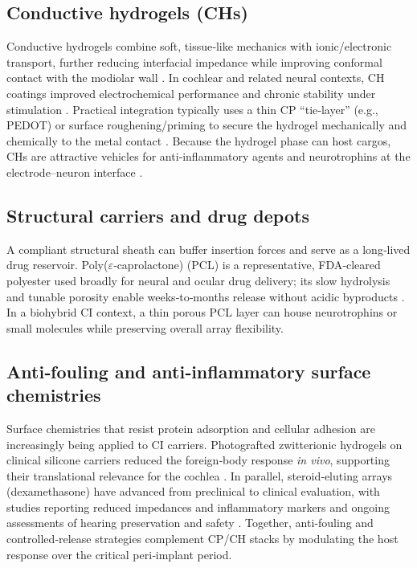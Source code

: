 \subsection{Conductive hydrogels (CHs)}
Conductive hydrogels combine soft, tissue‑like mechanics with ionic/electronic transport, further reducing interfacial impedance while improving conformal contact with the modiolar wall \cite{Green2012}. In cochlear and related neural contexts, CH coatings improved electrochemical performance and chronic stability under stimulation \cite{Hassarati2014,Dalrymple2020,Hyakumura2021}. Practical integration typically uses a thin CP “tie‑layer” (e.g., PEDOT) or surface roughening/priming to secure the hydrogel mechanically and chemically to the metal contact \cite{Kleber2017,Chhin2018}. Because the hydrogel phase can host cargos, CHs are attractive vehicles for anti‑inflammatory agents and neurotrophins at the electrode–neuron interface \cite{Green2012,Hassarati2014}.

\subsection{Structural carriers and drug depots}
A compliant structural sheath can buffer insertion forces and serve as a long‑lived drug reservoir. Poly($\varepsilon$‑caprolactone) (PCL) is a representative, FDA‑cleared polyester used broadly for neural and ocular drug delivery; its slow hydrolysis and tunable porosity enable weeks‑to‑months release without acidic byproducts \cite{Boia2019,Zhou2018}. In a biohybrid CI context, a thin porous PCL layer can house neurotrophins or small molecules while preserving overall array flexibility.

\subsection{Anti‑fouling and anti‑inflammatory surface chemistries}
Surface chemistries that resist protein adsorption and cellular adhesion are increasingly being applied to CI carriers. Photografted zwitterionic hydrogels on clinical silicone carriers reduced the foreign‑body response \textit{in vivo}, supporting their translational relevance for the cochlea \cite{Horne2023}. In parallel, steroid‑eluting arrays (dexamethasone) have advanced from preclinical to clinical evaluation, with studies reporting reduced impedances and inflammatory markers and ongoing assessments of hearing preservation and safety \cite{Kiefer2008Dexameth,Briggs2020,xu2018,Rahman2024,Toulemonde2021}. Together, anti‑fouling and controlled‑release strategies complement CP/CH stacks by modulating the host response over the critical peri‑implant period.

